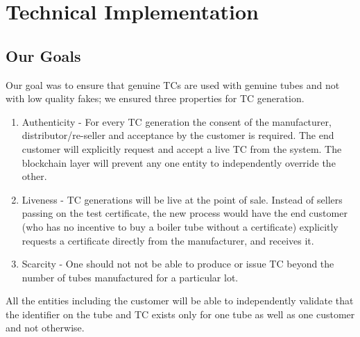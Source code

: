 \documentclass{article}
\begin{document}
\section{Technical Implementation}
\subsection{Our Goals}
Our goal was to ensure that genuine TCs are used with genuine tubes and not with low quality fakes; we ensured three properties for TC generation.
\begin{enumerate}
\item
Authenticity - For every TC generation the consent of the manufacturer, distributor/re-seller and acceptance by the customer is required. The end customer will explicitly request and accept a live TC from the system. The blockchain layer will prevent any one entity to independently override the other.
\item 
Liveness - TC generations will be live at the point of sale. 
Instead of sellers passing on the test certificate, the new process would have the end customer (who has no incentive to buy a boiler tube without a certificate) explicitly requests a certificate directly from the manufacturer, and receives it. 
\item 
Scarcity - %
One should not not be able to produce or issue TC beyond the number of tubes manufactured for a particular lot. 
\end{enumerate}
All the entities including the customer will be able to independently validate that the identifier on the tube and TC exists only for one tube as well as one customer and not otherwise. 
\end{document}
